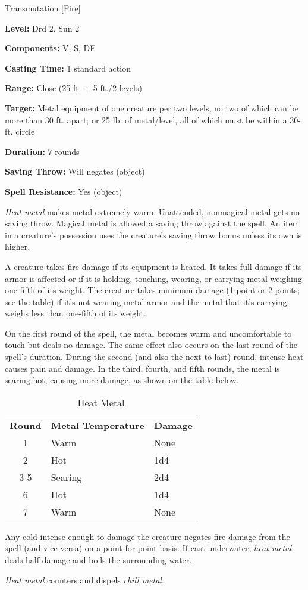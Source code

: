 
Transmutation [Fire]

\textbf{Level:} Drd 2, Sun 2

\textbf{Components:} V, S, DF

\textbf{Casting Time:} 1 standard action

\textbf{Range:} Close (25 ft. + 5 ft./2 levels)

\textbf{Target:} Metal equipment of one creature per two levels, no two of which 
can be more than 30 ft. apart; or 25 lb. of metal/level, all of which must be within 
a 30-ft. circle

\textbf{Duration:} 7 rounds

\textbf{Saving Throw:} Will negates (object)

\textbf{Spell Resistance:} Yes (object)

\textit{Heat metal} makes metal extremely warm. Unattended, nonmagical metal gets 
no saving throw. Magical metal is allowed a saving throw against the spell. An 
item in a creature's possession uses the creature's saving throw bonus unless its 
own is higher.

A creature takes fire damage if its equipment is heated. It takes full damage if 
its armor is affected or if it is holding, touching, wearing, or carrying metal 
weighing one-fifth of its weight. The creature takes minimum damage (1 point or 
2 points; see the table) if it's not wearing metal armor and the metal that it's 
carrying weighs less than one-fifth of its weight.

On the first round of the spell, the metal becomes warm and uncomfortable to touch 
but deals no damage. The same effect also occurs on the last round of the spell's 
duration. During the second (and also the next-to-last) round, intense heat causes 
pain and damage. In the third, fourth, and fifth rounds, the metal is searing hot, 
causing more damage, as shown on the table below.

\begin{table}[htb]
\caption{Heat Metal}
\centering
\begin{tabular}{c l l}
\textbf{Round} & \textbf{Metal Temperature} & \textbf{Damage}\\
1 & Warm & None\\
2 & Hot & 1d4\\
3-5 & Searing & 2d4\\
6 & Hot & 1d4\\
7 & Warm & None\\
\end{tabular}
\end{table}

Any cold intense enough to damage the creature negates fire damage from the spell 
(and vice versa) on a point-for-point basis. If cast underwater, \textit{heat metal 
}deals half damage and boils the surrounding water.

\textit{Heat metal} counters and dispels \textit{chill metal}.

